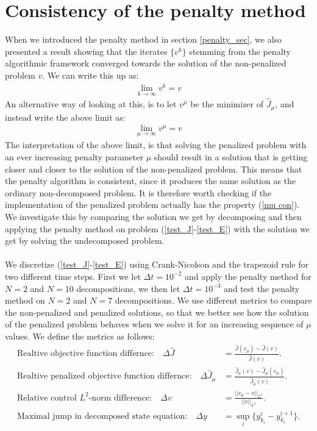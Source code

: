 \section{Consistency of the penalty method} \label{consistency_sec}
When we introduced the penalty method in section \ref{penalty_sec}, we also presented a result showing that the iterates $\{v^k\}$ stemming from the penalty algorithmic framework converged towards the solution of the non-penalized problem $v$. We can write this up as:
\begin{align*}
\lim_{k\rightarrow\infty} v^k = v 
\end{align*}  
An alternative way of looking at this, is to let $v^{\mu}$ be the minimizer of $\hat J_{\mu}$, and instead write the above limit as:
\begin{align}
\lim_{\mu\rightarrow\infty} v^{\mu} = v \label{mu con}
\end{align}
The interpretation of the above limit, is that solving the penalized problem with an ever increasing penalty parameter $\mu$ should result in a solution that is getting closer and closer to the solution of the non-penalized problem. This means that the penalty algorithm is consistent, since it produces the same solution as the ordinary non-decomposed problem. It is therefore worth checking if the implementation of the penalized problem actually has the property (\ref{mu con}). We investigate this by comparing the solution we get by decomposing and then applying the penalty method on problem (\ref{test_J}-\ref{test_E}) with the solution we get by solving the undecomposed problem. 
\\
\\
We discretize (\ref{test_J}-\ref{test_E}) using Crank-Nicolson and the trapezoid rule for two different time steps. First we let $\Delta t = 10^{-2}$ and apply the penalty method for $N=2$ and $N=10$ decompositions, we then let $\Delta t = 10^{-3}$ and test the penalty method on $N=2$ and $N=7$ decompositions. We use different metrics to compare the non-penalized and penalized solutions, so that we better see how the solution of the penalized problem behaves when we solve it for an increasing sequence of $\mu$ values. We define the metrics as follows:
\begin{align}
\textrm{Realtive objective function differnce:}\quad \Delta \hat J &= \frac{\hat{J}(v_{\mu})-\hat{J}(v)}{\hat{J}(v)}.\label{mes1}\\
\textrm{Realtive penalized objective function differnce:}\quad \Delta \hat J_{\mu} &= \frac{\hat{J}_{\mu}(v)-\hat{J}_{\mu}(v_{\mu})}{\hat{J}_{\mu}(v)}.\\
\textrm{Relative control $L^2$-norm difference:}\quad \Delta v&=\frac{||v_{\mu}-v||_ {L^2}}{||v||_{L^2}}. \\
\textrm{Maximal jump in decomposed state equation:}\quad \Delta y&= \sup_i\{y_{k_i}^i-y_{k_i}^{i+1}\}.\label{mes4}
\end{align}
